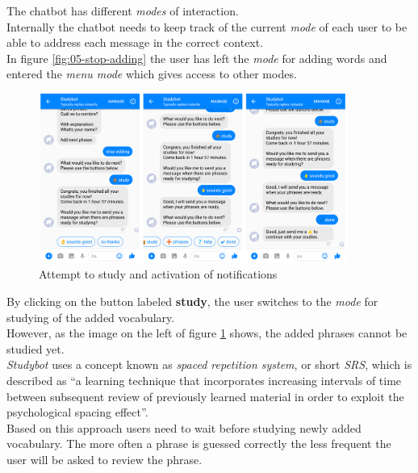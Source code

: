 The chatbot has different \emph{modes} of interaction.
\\
Internally the chatbot needs to keep track of the current \emph{mode} of each user to be able
to address each message in the correct context.
\\
In figure \ref{fig:05-stop-adding} the user has left the \emph{mode} for adding words
and entered the \emph{menu mode} which gives access to other modes.
\\

\begin{figure}[h]
  \centering
  \includegraphics[width=0.9\textwidth]{images/interface/06-enable-notify.png}
	\caption{Attempt to study and activation of notifications}
	\label{fig:06-enable-notify}
\end{figure}

By clicking on the button labeled \textbf{study},
the user switches to the \emph{mode} for studying of the added vocabulary.
\\
However, as the image on the left of figure \ref{fig:06-enable-notify} shows,
the added phrases cannot be studied yet.
\\

\emph{Studybot} uses a concept known as \emph{spaced repetition system}, or short \emph{SRS},
which is described as ``a learning technique that incorporates increasing intervals of time between subsequent review of previously learned material in order to exploit the psychological spacing effect''.\cite{srs}
\\
Based on this approach users need to wait before studying newly added vocabulary.
The more often a phrase is guessed correctly the less frequent the user will be asked to review the phrase.
\\

